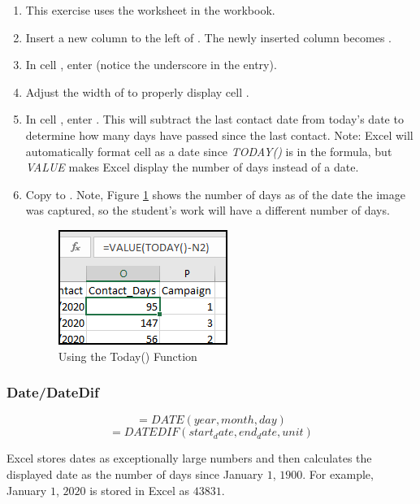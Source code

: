 \begin{enumbox}
	\begin{enumerate}
		\item This exercise uses the  worksheet in the  workbook.
		\item Insert a new column to the left of . The newly inserted column becomes .
		\item In cell , enter  (notice the underscore in the entry).
		\item Adjust the width of  to properly display cell .
		\item In cell , enter . This will subtract the last contact date from today's date to determine how many days have passed since the last contact. Note: Excel will automatically format cell  as a date since \textit{TODAY()} is in the formula, but \textit{VALUE} makes Excel display the number of days instead of a date.
		\item Copy  to . Note, Figure \ref{09:fig45} shows the number of days as of the date the image was captured, so the student's work will have a different number of days.
		
		\begin{figure}[H]
			\centering
			\includegraphics[width=\maxwidth{.50\linewidth}]{gfx/ch09_fig45}
			\caption{Using the Today() Function}
			\label{09:fig45}
		\end{figure}
		
	\end{enumerate}
\end{enumbox}
	
\subsubsection{Date/DateDif}

\[ =DATE(year, month, day) \]
\[ =DATEDIF (start_date, end_date, unit) \]

Excel stores dates as exceptionally large numbers and then calculates the displayed date as the number of days since January $ 1 $, $ 1900 $. For example, January $ 1 $, $ 2020 $ is stored in Excel as $ 43831 $. 

